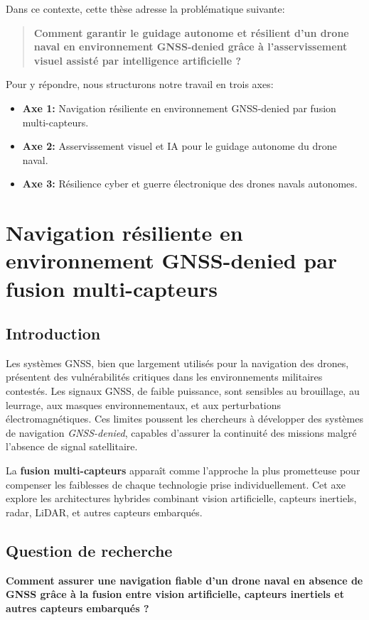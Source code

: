 \documentclass[12pt, a4paper, twoside, openright]{report}
\begin{document}
Dans ce contexte, cette thèse adresse la problématique suivante:
\begin{quote}
    \textbf{Comment garantir le guidage autonome et résilient d’un drone naval en environnement GNSS-denied grâce à l’asservissement visuel assisté par intelligence artificielle ?}
\end{quote}

Pour y répondre, nous structurons notre travail en trois axes:
\begin{itemize}
    \item \textbf{Axe 1:} Navigation résiliente en environnement GNSS-denied par fusion multi-capteurs.
    \item \textbf{Axe 2:} Asservissement visuel et IA pour le guidage autonome du drone naval.
    \item \textbf{Axe 3:} Résilience cyber et guerre électronique des drones navals autonomes.
\end{itemize}

\cleardoublepage
\chapter{Navigation résiliente en environnement GNSS-denied par fusion multi-capteurs}\label{chap:axe1}

\section{Introduction}
Les systèmes GNSS, bien que largement utilisés pour la navigation des drones, présentent des vulnérabilités critiques dans les environnements militaires contestés. Les signaux GNSS, de faible puissance, sont sensibles au brouillage, au leurrage, aux masques environnementaux, et aux perturbations électromagnétiques. Ces limites poussent les chercheurs à développer des systèmes de navigation \textit{GNSS-denied}, capables d’assurer la continuité des missions malgré l’absence de signal satellitaire.

La \textbf{fusion multi-capteurs} apparaît comme l’approche la plus prometteuse pour compenser les faiblesses de chaque technologie prise individuellement. Cet axe explore les architectures hybrides combinant vision artificielle, capteurs inertiels, radar, LiDAR, et autres capteurs embarqués.

\section{Question de recherche}
\begin{framed}
    \textbf{Comment assurer une navigation fiable d’un drone naval en absence de GNSS grâce à la fusion entre vision artificielle, capteurs inertiels et autres capteurs embarqués ?}
\end{framed}
\end{document}
